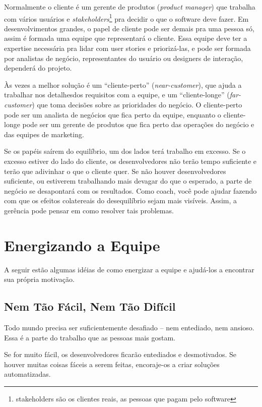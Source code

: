 \documentclass[a4paper, 10pt, font=plain]{abnt}
\begin{document}
Normalmente o cliente é um gerente de produtos (\textit{product manager}) que trabalha com vários usuários e \textit{stakeholders}\footnote{stakeholders são os clientes reais, as pessoas que pagam pelo software} pra decidir o que o software deve fazer. Em desenvolvimentos grandes, o papel de cliente pode ser demais pra uma pessoa só, assim é formada uma equipe que representará o cliente. Essa equipe deve ter a expertise necessária pra lidar com user stories e priorizá-las, e pode ser formada por analistas de negócio, representantes do usuário ou designers de interação, dependerá do projeto.

Às vezes a melhor solução é um ``cliente-perto'' (\textit{near-customer}), que ajuda a trabalhar nos detalhesdos requisitos com a equipe, e um ``cliente-longe'' (\textit{far-customer}) que toma decisões sobre as prioridades do negócio. O cliente-perto pode ser um analista de negócios que fica perto da equipe, enquanto o cliente-longe pode ser um gerente de produtos que fica perto das operações do negócio e das equipes de marketing.

Se os papéis saírem do equilíbrio, um dos lados terá trabalho em excesso. Se o excesso estiver do lado do cliente, os desenvolvedores não terão tempo suficiente e terão que adivinhar o que o cliente quer. Se não houver desenvolvedores suficiente, ou estiverem trabalhando mais devagar do que o esperado, a parte de negócio se desapontará com os resultados. Como coach, você pode ajudar fazendo com que os efeitos colatereais do desequilíbrio sejam mais visíveis. Assim, a gerência pode pensar em como resolver tais problemas.



\section{Energizando a Equipe}
A seguir estão algumas idéias de como energizar a equipe e ajudá-los a encontrar sua própria motivação.


\subsection{Nem Tão Fácil, Nem Tão Difícil}
Todo mundo precisa ser suficientemente desafiado -- nem entediado, nem ansioso. Essa é a parte do trabalho que as pessoas mais gostam.

Se for muito fácil, os desenvolvedores ficarão entediados e desmotivados. Se houver muitas coisas fáceis a serem feitas, encoraje-os a criar soluções automatizadas.
\end{document}
